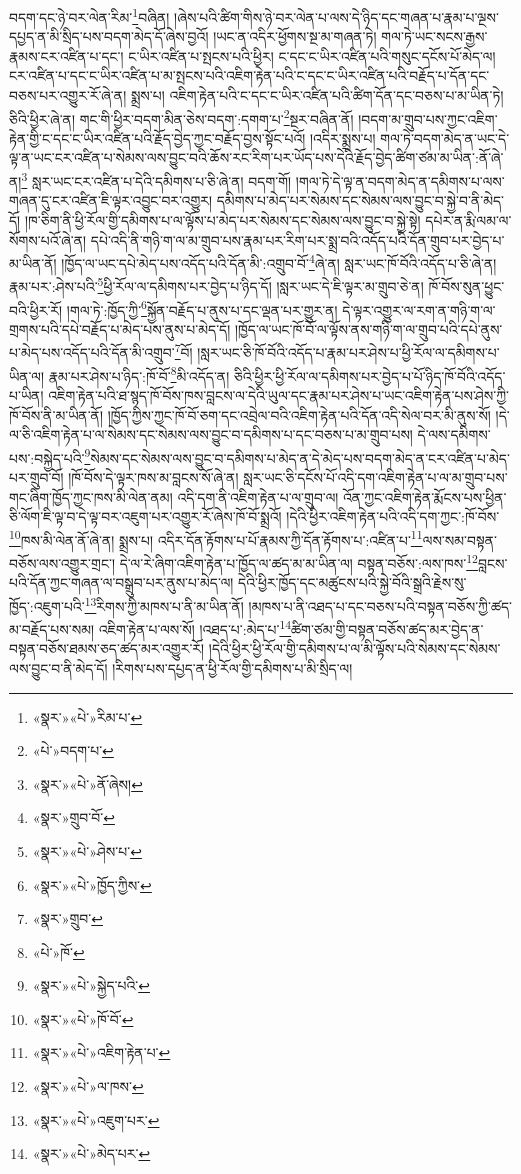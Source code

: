 བདག་དང་ཉེ་བར་ལེན་རིམ་\footnote{«སྣར་»«པེ་»རིམ་པ་}བཞིན། །ཞེས་པའི་ཚིག་གིས་ཉེ་བར་ལེན་པ་ལས་དེ་ཉིད་དང་གཞན་པ་རྣམ་པ་ལྔས་དཔྱད་ན་མི་སྲིད་པས་བདག་མེད་དོ་ཞེས་བྱའོ། །ཡང་ན་འདིར་ཕྱོགས་སྔ་མ་གཞན་ཏེ། གལ་ཏེ་ཡང་སངས་རྒྱས་རྣམས་ངར་འཛིན་པ་དང་། ང་ཡིར་འཛིན་པ་སྤངས་པའི་ཕྱིར། ང་དང་ང་ཡིར་འཛིན་པའི་གསུང་དངོས་པོ་མེད་ལ། ངར་འཛིན་པ་དང་ང་ཡིར་འཛིན་པ་མ་སྤངས་པའི་འཇིག་རྟེན་པའི་ང་དང་ང་ཡིར་འཛིན་པའི་བརྗོད་པ་དོན་དང་བཅས་པར་འགྱུར་རོ་ཞེ་ན། སྨྲས་པ། འཇིག་རྟེན་པའི་ང་དང་ང་ཡིར་འཛིན་པའི་ཚིག་དོན་དང་བཅས་པ་མ་ཡིན་ཏེ། ཅིའི་ཕྱིར་ཞེ་ན། གང་གི་ཕྱིར་བདག་མིན་ཅེས་བདག་:དགག་པ་\footnote{«པེ་»བདག་པ་}སྔར་བཞིན་ནོ། །བདག་མ་གྲུབ་པས་ཀྱང་འཇིག་རྟེན་གྱི་ང་དང་ང་ཡིར་འཛིན་པའི་རྗོད་བྱེད་ཀྱང་བརྗོད་བྱས་སྟོང་པའོ། །འདིར་སྨྲས་པ། གལ་ཏེ་བདག་མེད་ན་ཡང་དེ་ལྟ་ན་ཡང་ངར་འཛིན་པ་སེམས་ལས་བྱུང་བའི་ཆོས་རང་རིག་པར་ཡོད་པས་དེའི་རྗོད་བྱེད་ཚིག་ཙམ་མ་ཡིན་:ནོ་ཞེ་ན།\footnote{«སྣར་»«པེ་»ནོ་ཞེས།} སླར་ཡང་ངར་འཛིན་པ་དེའི་དམིགས་པ་ཅི་ཞེ་ན། བདག་གོ། །གལ་ཏེ་དེ་ལྟ་ན་བདག་མེད་ན་དམིགས་པ་ལས་གཞན་དུ་ངར་འཛིན་ཇི་ལྟར་འབྱུང་བར་འགྱུར། དམིགས་པ་མེད་པར་སེམས་དང་སེམས་ལས་བྱུང་བ་སྐྱེ་བ་ནི་མེད་དོ། །ཁ་ཅིག་ནི་ཕྱི་རོལ་གྱི་དམིགས་པ་ལ་ལྟོས་པ་མེད་པར་སེམས་དང་སེམས་ལས་བྱུང་བ་སྐྱེ་སྟེ། དཔེར་ན་རྨི་ལམ་ལ་སོགས་པའོ་ཞེ་ན། དཔེ་འདི་ནི་གཉི་ག་ལ་མ་གྲུབ་པས་རྣམ་པར་རིག་པར་སྨྲ་བའི་འདོད་པའི་དོན་གྲུབ་པར་བྱེད་པ་མ་ཡིན་ནོ། །ཁྱོད་ལ་ཡང་དཔེ་མེད་པས་འདོད་པའི་དོན་མི་:འགྲུབ་བོ་\footnote{«སྣར་»གྲུབ་བོ་}ཞེ་ན། སླར་ཡང་ཁོ་བོའི་འདོད་པ་ཅི་ཞེ་ན། རྣམ་པར་:ཤེས་པའི་\footnote{«སྣར་»«པེ་»ཤེས་པ་}ཕྱི་རོལ་ལ་དམིགས་པར་བྱེད་པ་ཉིད་དོ། །སླར་ཡང་དེ་ཇི་ལྟར་མ་གྲུབ་ཅེ་ན། ཁོ་བོས་སུན་ཕྱུང་བའི་ཕྱིར་རོ། །གལ་ཏེ་:ཁྱོད་ཀྱི་\footnote{«སྣར་»«པེ་»ཁྱོད་ཀྱིས་}སྐྱོན་བརྗོད་པ་ནུས་པ་དང་ལྡན་པར་གྱུར་ན། དེ་ལྟར་འགྱུར་ལ་རག་ན་གཉི་ག་ལ་གྲགས་པའི་དཔེ་བརྗོད་པ་མེད་པས་ནུས་པ་མེད་དོ། །ཁྱོད་ལ་ཡང་ཁོ་བོ་ལ་ལྟོས་ནས་གཉི་ག་ལ་གྲུབ་པའི་དཔེ་ནུས་པ་མེད་པས་འདོད་པའི་དོན་མི་འགྲུབ་\footnote{«སྣར་»གྲུབ་}བོ། །སླར་ཡང་ཅི་ཁོ་བོའི་འདོད་པ་རྣམ་པར་ཤེས་པ་ཕྱི་རོལ་ལ་དམིགས་པ་ཡིན་ལ། རྣམ་པར་ཤེས་པ་ཉིད་:ཁོ་བོ་\footnote{«པེ་»ཁོ་}མི་འདོད་ན། ཅིའི་ཕྱིར་ཕྱི་རོལ་ལ་དམིགས་པར་བྱེད་པ་པོ་ཉིད་ཁོ་བོའི་འདོད་པ་ཡིན། འཇིག་རྟེན་པའི་ཐ་སྙད་ཁོ་བོས་ཁས་བླངས་ལ་དེའི་ཡུལ་དང་རྣམ་པར་ཤེས་པ་ཡང་འཇིག་རྟེན་པས་ཤེས་ཀྱི་ཁོ་བོས་ནི་མ་ཡིན་ནོ། །ཁྱོད་ཀྱིས་ཀྱང་ཁོ་བོ་ཅག་དང་འབྲེལ་བའི་འཇིག་རྟེན་པའི་དོན་འདི་སེལ་བར་མི་ནུས་སོ། །དེ་ལ་ཅི་འཇིག་རྟེན་པ་ལ་སེམས་དང་སེམས་ལས་བྱུང་བ་དམིགས་པ་དང་བཅས་པ་མ་གྲུབ་པས། དེ་ལས་དམིགས་པས་:བསྐྱེད་པའི་\footnote{«སྣར་»«པེ་»སྐྱེད་པའི་}སེམས་དང་སེམས་ལས་བྱུང་བ་དམིགས་པ་མེད་ན་དེ་མེད་པས་བདག་མེད་ན་ངར་འཛིན་པ་མེད་པར་གྲུབ་བོ། །ཁོ་བོས་དེ་ལྟར་ཁས་མ་བླངས་སོ་ཞེ་ན། སླར་ཡང་ཅི་དངོས་པོ་འདི་དག་འཇིག་རྟེན་པ་ལ་མ་གྲུབ་པས་གང་ཞིག་ཁྱོད་ཀྱང་ཁས་མི་ལེན་ནམ། འདི་དག་ནི་འཇིག་རྟེན་པ་ལ་གྲུབ་ལ། འོན་ཀྱང་འཇིག་རྟེན་རྨོངས་པས་ཕྱིན་ཅི་ལོག་ཇི་ལྟ་བ་དེ་ལྟ་བར་འཇུག་པར་འགྱུར་རོ་ཞེས་ཁོ་བོ་སྨྲའོ། །དེའི་ཕྱིར་འཇིག་རྟེན་པའི་འདི་དག་ཀྱང་:ཁོ་བོས་\footnote{«སྣར་»«པེ་»ཁོ་བོ་}ཁས་མི་ལེན་ནོ་ཞེ་ན། སྨྲས་པ། འདིར་དོན་རྟོགས་པ་པོ་རྣམས་ཀྱི་དོན་རྟོགས་པ་:འཛིན་པ་\footnote{«སྣར་»«པེ་»འཇིག་རྟེན་པ་}ལས་སམ་བསྟན་བཅོས་ལས་འགྱུར་གྲང་། དེ་ལ་རེ་ཞིག་འཇིག་རྟེན་པ་ཁྱོད་ལ་ཚད་མ་མ་ཡིན་ལ། བསྟན་བཅོས་:ལས་ཁས་\footnote{«སྣར་»«པེ་»ལ་ཁས་}བླངས་པའི་དོན་ཀྱང་གཞན་ལ་བསྒྲུབ་པར་ནུས་པ་མེད་ལ། དེའི་ཕྱིར་ཁྱོད་དང་མཚུངས་པའི་སྐྱེ་བོའི་སྒྲའི་རྗེས་སུ་ཁྱོད་:འཇུག་པའི་\footnote{«སྣར་»«པེ་»འཇུག་པར་}རིགས་ཀྱི་མཁས་པ་ནི་མ་ཡིན་ནོ། །མཁས་པ་ནི་འཐད་པ་དང་བཅས་པའི་བསྟན་བཅོས་ཀྱི་ཚད་མ་བརྗོད་པས་སམ། འཇིག་རྟེན་པ་ལས་སོ། །འཐད་པ་:མེད་པ་\footnote{«སྣར་»«པེ་»མེད་པར་}ཚིག་ཙམ་གྱི་བསྟན་བཅོས་ཚད་མར་བྱེད་ན་བསྟན་བཅོས་ཐམས་ཅད་ཚད་མར་འགྱུར་རོ། །དེའི་ཕྱིར་ཕྱི་རོལ་གྱི་དམིགས་པ་ལ་མི་ལྟོས་པའི་སེམས་དང་སེམས་ལས་བྱུང་བ་ནི་མེད་དོ། །རིགས་པས་དཔྱད་ན་ཕྱི་རོལ་གྱི་དམིགས་པ་མི་སྲིད་ལ། 